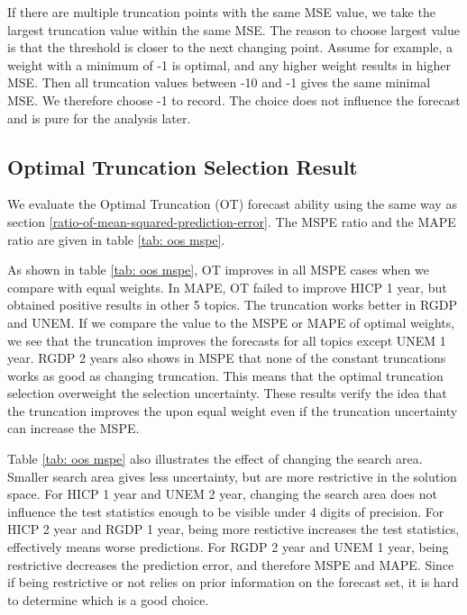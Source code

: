 \documentclass[11pt]{article}
\begin{document}
If there are
multiple truncation points with the same MSE value, we take the
largest truncation value within the same MSE. The reason to
choose largest value is that the threshold is closer to the next
changing point. Assume for example, a weight with a minimum of -1 is
optimal, and any higher weight results in higher MSE. Then all
truncation values between -10 and -1 gives the same minimal MSE. We
therefore choose -1 to record. The choice does not influence the
forecast and is pure for the analysis later.

\subsection{Optimal Truncation Selection Result}\label{out-of-sample-truncation-result}
We evaluate the Optimal Truncation (OT) forecast ability using the same way as section \ref{ratio-of-mean-squared-prediction-error}. The MSPE ratio and the MAPE ratio are given in table \ref{tab: oos mspe}.

As shown in table \ref{tab: oos mspe}, OT improves in all
MSPE cases when we compare with equal weights. In MAPE, OT failed to improve HICP 1 year, but obtained positive results in other 5 topics. The truncation works better in RGDP and UNEM. If we compare the value to the MSPE or MAPE of optimal weights, we see that the truncation improves the forecasts for all topics except UNEM 1 year. RGDP 2 years also shows in MSPE that none of the constant truncations works as good as changing truncation. This means that the optimal truncation selection overweight the selection uncertainty. These results verify the idea that the truncation improves the upon equal weight even if the truncation uncertainty can increase the MSPE. 

Table \ref{tab: oos mspe} also illustrates the effect of changing the search area. Smaller search area gives less uncertainty, but are more restrictive in the solution space. For HICP 1 year and UNEM 2 year, changing the search area does not influence the test statistics enough to be visible under 4 digits of precision. For HICP 2 year and RGDP 1 year, being more restictive increases the test statistics, effectively means worse predictions. For RGDP 2 year and UNEM 1 year, being restrictive decreases the prediction error, and therefore MSPE and MAPE. Since if being restrictive or not relies on prior information on the forecast set, it is hard to determine which is a good choice.
\end{document}
